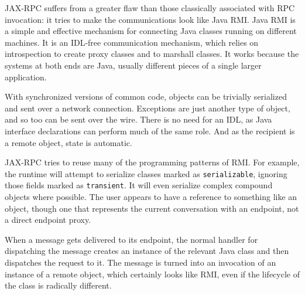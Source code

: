 JAX-RPC suffers from a greater flaw than those classically associated
with RPC invocation: it tries to make the communications look like
Java RMI. Java RMI is a simple and effective mechanism for connecting
Java classes running on different machines. It is an IDL-free
communication mechanism, which relies on introspection to create proxy
classes and to marshall classes. It works because the systems at both
ends are Java, usually different pieces of a single larger
application.

With synchronized versions of common code, objects can be trivially
serialized and sent over a network connection. Exceptions are just
another type of object, and so too can be sent over the wire. There is
no need for an IDL, as Java interface declarations can perform much of
the same role. And as the recipient is a remote object, state is
automatic.

JAX-RPC tries to reuse many of the programming patterns of RMI. For
example, the runtime will attempt to serialize classes marked as
\verb|serializable|, ignoring those fields marked as
\verb|transient|. It will even serialize complex compound objects where
possible. The user appears to have a reference to something like an
object, though one that represents the current conversation with an
endpoint, not a direct endpoint proxy.

When a message gets delivered to its endpoint, the normal handler for
dispatching the message creates an instance of the relevant Java class
and then dispatches the request to it. The message is turned into an
invocation of an instance of a remote object, which certainly looks
like RMI, even if the lifecycle of the class is radically different.

%

